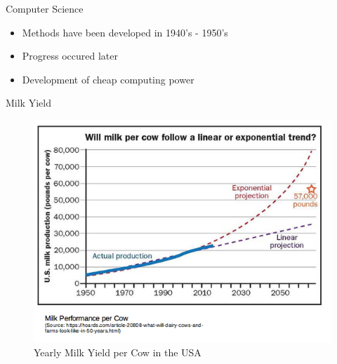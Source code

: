 \documentclass[ignorenonframetext,]{beamer}
\providecommand{\tightlist}{%
  \setlength{\itemsep}{0pt}\setlength{\parskip}{0pt}}
\begin{document}
\begin{frame}{Computer Science}
\protect\hypertarget{computer-science}{}

\begin{itemize}
\tightlist
\item
  Methods have been developed in 1940's - 1950's
\item
  Progress occured later
\item
  Development of cheap computing power
\end{itemize}


\end{frame}

\begin{frame}{Milk Yield}
\protect\hypertarget{milk-yield}{}

\begin{figure}
\centering
\includegraphics{odg/milkcompperf.png}
\caption{Yearly Milk Yield per Cow in the USA}
\end{figure}


\end{frame}
\end{document}
